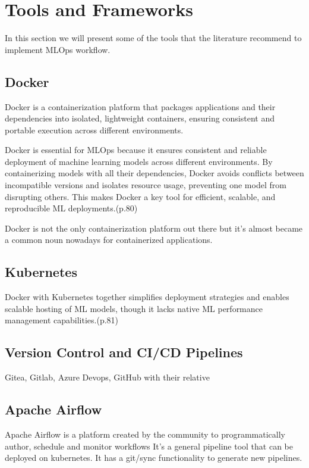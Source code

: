 \section{Tools and Frameworks}\label{sec:tools}

In this section we will present some of the tools that the literature recommend to implement MLOps workflow.

\subsection{Docker}\label{subsec:docker}
Docker\cite{docker} is a containerization platform that packages applications and their dependencies into isolated,
lightweight containers, ensuring consistent and portable execution across different environments.

Docker is essential for MLOps because it ensures consistent and reliable deployment of machine learning models across different environments.
By containerizing models with all their dependencies, Docker avoids conflicts between incompatible versions and isolates resource usage,
preventing one model from disrupting others.
This makes Docker a key tool for efficient, scalable, and reproducible ML deployments.\cite{treveil2020introducing}(p.80)

Docker is not the only containerization platform out there but it's almost became a common noun nowadays for containerized applications.

\subsection{Kubernetes}\label{subsec:kubernetes2}

Docker with Kubernetes together simplifies deployment strategies and enables scalable hosting of ML models,
though it lacks native ML performance management capabilities.\cite{treveil2020introducing}(p.81)

\subsection{Version Control and CI/CD Pipelines}\label{subsec:version-control-and-ci/cd-pipelines}
Gitea, Gitlab, Azure Devops, GitHub with their relative

\subsection{Apache Airflow}
Apache Airflow\cite{airflow} is a platform created by the community to programmatically author, schedule and monitor workflows\cite{airflow}
It's a general pipeline tool that can be deployed on kubernetes.
It has a git/sync functionality to generate new pipelines.

